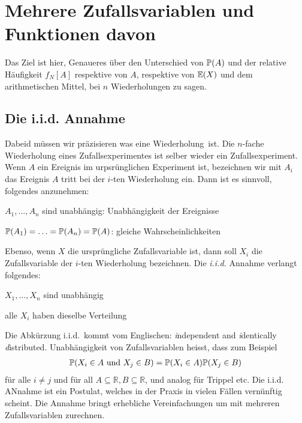 \chapter{Mehrere Zufallsvariablen und Funktionen davon}
Das Ziel ist hier, Genaueres über den Unterschied von $\mathbb P(A)$ und der relative Häufigkeit $f_N[A]$ respektive von $A$, respektive von $\operatorname{\mathbb E}(X)$ und dem arithmetischen Mittel, bei $n$ Wiederholungen zu sagen.
\section{Die i.i.d. Annahme}
Dabeid müssen wir präzisieren was eine \glqq Wiederholung\grqq\ ist. Die $n$-fache Wiederholung eines Zufallsexperimentes ist selber wieder ein Zufallsexperiment. Wenn $A$ ein Ereignis im urpsrünglichen Experiment ist, bezeichnen wir mit $A_i$ das Ereignis \glqq $A$ tritt bei der $i$-ten Wiederholung ein\grqq. Dann ist es sinnvoll, folgendes anzunehmen:
\begin{compactitem}
	\item $A_1,\ldots,A_n$ sind unabhängig: Unabhängigkeit der Ereignisse
	\item $\mathbb P(A_1)=\ldots = \mathbb P(A_n)=\mathbb P(A)$: gleiche Wahrscheinlichkeiten\\
\end{compactitem}
Ebenso, wenn $X$ die ursprüngliche Zufallsvariable ist, dann soll $X_i$ die Zufallsvariable der $i$-ten Wiederholung bezeichnen. Die \emph{i.i.d.} Annahme verlangt folgendes:
\begin{compactitem}
	\item $X_1,\ldots,X_n$ sind unabhängig
	\item alle $X_i$ haben dieselbe Verteilung
\end{compactitem}
Die Abkürzung \glqq i.i.d.\grqq\ kommt vom Englischen: \emph{i}ndependent and \emph{i}dentically \emph{d}istributed. Unabhängigkeit von Zufallsvariablen heisst, dass zum Beispiel
\begin{gather*}
	\mathbb P(X_i\in A\text{ und }X_j\in B)= \mathbb P(X_i\in A)\mathbb P(X_j\in B)
\end{gather*}
für alle $i\neq j$ und für all $A\subseteq \mathbb{R}, B\subseteq \mathbb{R}$, und analog für Trippel etc. Die i.i.d. ANnahme ist ein \glqq Postulat\grqq, welches in der Praxis in vielen Fällen vernünftig scheint. Die Annahme bringt erhebliche Vereinfachungen um mit mehreren Zufallsvariablen zurechnen.

